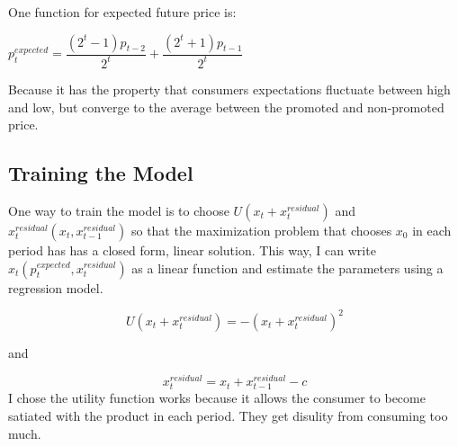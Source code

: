 \documentclass{article}
\begin{document}
One function for expected future price is:

$p^{expected}_t = \dfrac {(2^t-1)p_{t-2}} {2^t} + \dfrac {(2^t+1)p_{t-1}} {2^t}$ 

Because it has the property that consumers expectations fluctuate between high and low, but converge to the average between the promoted and non-promoted price.


\subsection{Training the Model}

One way to train the model is to choose $U(x_t + x^{residual}_t)$ and $x^{residual}_t(x_t,x^{residual}_{t-1})$ so that the maximization problem that chooses $x_0$ in each period has has a closed form, linear solution. This way, I can write $x_t(p_t^{expected},x^{residual}_t)$ as a linear function and estimate the parameters using a regression model.

$$U(x_t + x^{residual}_t) = -(x_t + x^{residual}_t)^2$$ 

and 

$$x^{residual}_t = x_t + x^{residual}_{t-1} - c$$
I chose the utility function works because it allows the consumer to become satiated with the product in each period. They get disulity from consuming too much.


{}

\end{document}
